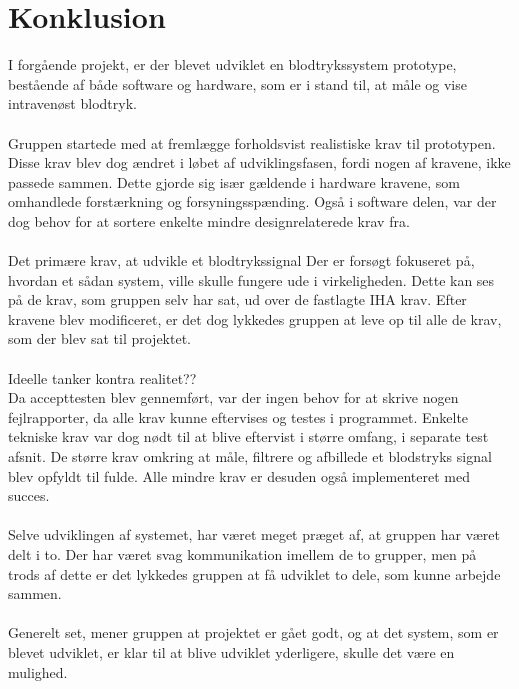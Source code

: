 \chapter{Konklusion}
I forgående projekt, er der blevet udviklet en blodtrykssystem prototype, bestående af både software og hardware, som er i stand til, at måle og vise intravenøst blodtryk. \\

\\
Gruppen startede med at fremlægge forholdsvist realistiske krav til prototypen. Disse krav blev dog ændret i løbet af udviklingsfasen, fordi nogen af kravene, ikke passede sammen. Dette gjorde sig især gældende i hardware kravene, som omhandlede forstærkning og forsyningsspænding. Også i software delen, var der dog behov for at sortere enkelte mindre designrelaterede krav fra.  \\
\\

Det primære krav, at udvikle et blodtrykssignal 
Der er forsøgt fokuseret på, hvordan et sådan system, ville skulle fungere ude i virkeligheden. Dette kan ses på de krav, som gruppen selv har sat, ud over de fastlagte IHA krav. Efter kravene blev modificeret, er det dog lykkedes gruppen at leve op til alle de krav, som der blev sat til projektet. \\

\\

Ideelle tanker kontra realitet??\\

Da accepttesten blev gennemført, var der ingen behov for at skrive nogen fejlrapporter, da alle krav kunne eftervises og testes i programmet. Enkelte tekniske krav var dog nødt til at blive eftervist i større omfang, i separate test afsnit. De større krav omkring at måle, filtrere og afbillede et blodstryks signal blev opfyldt til fulde. Alle mindre krav er desuden også implementeret med succes.\\
\\
Selve udviklingen af systemet, har været meget præget af, at gruppen har været delt i to. Der har været svag kommunikation imellem de to grupper, men på trods af dette er det lykkedes gruppen at få udviklet to dele, som kunne arbejde sammen. \\
\\
Generelt set, mener gruppen at projektet er gået godt, og at det system, som er blevet udviklet, er klar til at blive udviklet yderligere, skulle det være en mulighed. \\
\\
